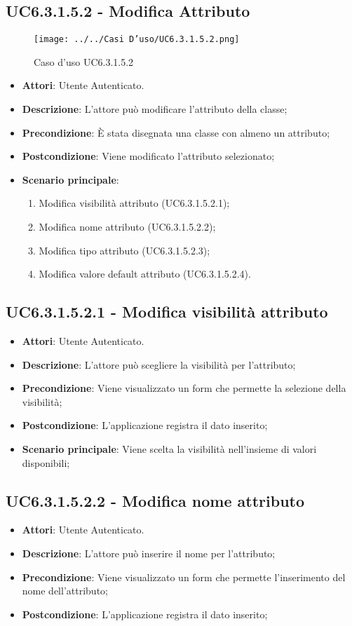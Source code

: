 \subsection{UC6.3.1.5.2 - Modifica Attributo} 
\label{ssec:UC6.3.1.5.2} 
\begin{figure}[h!] 
\centering 
\texttt{[image: ../../Casi D'uso/UC6.3.1.5.2.png]} 
\caption{Caso d'uso UC6.3.1.5.2} 
 \end{figure} 
\begin{itemize} 
\item \textbf{Attori}: Utente Autenticato.
\item \textbf{Descrizione}: L'attore può modificare l'attributo della classe;
\item \textbf{Precondizione}: È stata disegnata una classe con almeno un attributo;
\item \textbf{Postcondizione}: Viene modificato l'attributo selezionato;
\item \textbf{Scenario principale}: \begin{enumerate}\item Modifica visibilità attributo (UC6.3.1.5.2.1);\item Modifica nome attributo (UC6.3.1.5.2.2);\item Modifica tipo attributo (UC6.3.1.5.2.3);\item Modifica valore default attributo (UC6.3.1.5.2.4). 
 \end{enumerate}
\end{itemize} 
\subsection{UC6.3.1.5.2.1 - Modifica visibilità attributo} 
\label{ssec:UC6.3.1.5.2.1} 
\begin{itemize} 
\item \textbf{Attori}: Utente Autenticato.
\item \textbf{Descrizione}: L'attore può scegliere la visibilità per l'attributo;
\item \textbf{Precondizione}: Viene visualizzato un form che permette la selezione della visibilità;
\item \textbf{Postcondizione}: L'applicazione registra il dato inserito;
\item \textbf{Scenario principale}: Viene scelta la visibilità nell'insieme di valori disponibili;\end{itemize} 
\subsection{UC6.3.1.5.2.2 - Modifica nome attributo} 
\label{ssec:UC6.3.1.5.2.2} 
\begin{itemize} 
\item \textbf{Attori}: Utente Autenticato.
\item \textbf{Descrizione}: L'attore può inserire il nome per l'attributo;
\item \textbf{Precondizione}: Viene visualizzato un form che permette l'inserimento del nome dell'attributo;
\item \textbf{Postcondizione}: L'applicazione registra il dato inserito;
\end{itemize} 
